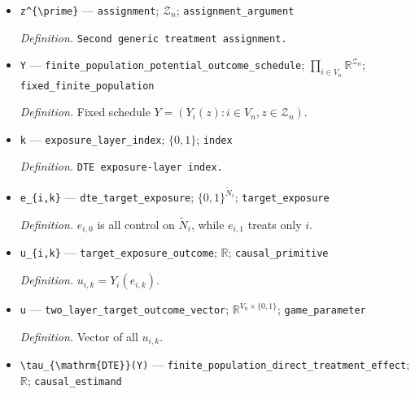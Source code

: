 \documentclass{article}
\begin{document}
\begin{itemize}
  \par\smallskip\noindent\emph{Definition.} \texttt{Generic binary treatment assignment.}
  \item \texttt{z\textasciicircum{}\{\textbackslash{}\allowbreak{}prime\}\allowbreak{}} --- \texttt{assignment}; \(\mathcal Z_n\); \texttt{assignment\_\allowbreak{}argument}
  \par\smallskip\noindent\emph{Definition.} \texttt{Second generic treatment assignment.}
  \item \texttt{Y} --- \texttt{finite\_\allowbreak{}population\_\allowbreak{}potential\_\allowbreak{}outcome\_\allowbreak{}schedule}; \(\prod_{i\in V_n}\mathbb R^{\mathcal Z_n}\); \texttt{fixed\_\allowbreak{}finite\_\allowbreak{}population}
  \par\smallskip\noindent\emph{Definition.} Fixed schedule \(Y=(Y_i(z):i\in V_n,z\in\mathcal Z_n)\).
  \item \texttt{k} --- \texttt{exposure\_\allowbreak{}layer\_\allowbreak{}index}; \(\{0,1\}\); \texttt{index}
  \par\smallskip\noindent\emph{Definition.} \texttt{DTE exposure-\allowbreak{}layer index.}
  \item \texttt{e\_\allowbreak{}\{i,\allowbreak{}k\}\allowbreak{}} --- \texttt{dte\_\allowbreak{}target\_\allowbreak{}exposure}; \(\{0,1\}^{\widetilde N_i}\); \texttt{target\_\allowbreak{}exposure}
  \par\smallskip\noindent\emph{Definition.} \(e_{i,0}\) is all control on \(\widetilde N_i\), while \(e_{i,1}\) treats only \(i\).
  \item \texttt{u\_\allowbreak{}\{i,\allowbreak{}k\}\allowbreak{}} --- \texttt{target\_\allowbreak{}exposure\_\allowbreak{}outcome}; \(\mathbb R\); \texttt{causal\_\allowbreak{}primitive}
  \par\smallskip\noindent\emph{Definition.} \(u_{i,k}=Y_i(e_{i,k})\).
  \item \texttt{u} --- \texttt{two\_\allowbreak{}layer\_\allowbreak{}target\_\allowbreak{}outcome\_\allowbreak{}vector}; \(\mathbb R^{V_n\times\{0,1\}}\); \texttt{game\_\allowbreak{}parameter}
  \par\smallskip\noindent\emph{Definition.} Vector of all \(u_{i,k}\).
  \item \texttt{\textbackslash{}\allowbreak{}tau\_\allowbreak{}\{\textbackslash{}\allowbreak{}mathrm\{DTE\}\allowbreak{}\}\allowbreak{}(Y)} --- \texttt{finite\_\allowbreak{}population\_\allowbreak{}direct\_\allowbreak{}treatment\_\allowbreak{}effect}; \(\mathbb R\); \texttt{causal\_\allowbreak{}estimand}

\end{itemize}
\end{document}
